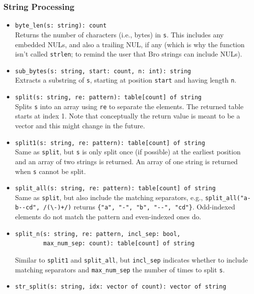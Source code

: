 \documentclass[10pt,landscape]{article}
\begin{document}
\begin{multicols*}{2}
\subsubsection*{String Processing}

\begin{itemize}
  \item \verb|byte_len(s: string): count|\\
    Returns the number of characters (i.e., bytes) in \texttt{s}.  This
    includes any embedded NULs, and also a trailing NUL, if any (which is why
    the function isn't called \verb|strlen|; to remind the user that Bro
    strings can include NULs).
  \item \verb|sub_bytes(s: string, start: count, n: int): string|\\
    Extracts a substring of \texttt{s}, starting at position \texttt{start} and
    having length \texttt{n}.
  \item \verb|split(s: string, re: pattern): table[count] of string|\\
    Splits \texttt{s} into an array using \texttt{re} to separate the elements.
    The returned table starts at index 1. Note that conceptually the return
    value is meant to be a vector and this might change in the future.
  \item \verb|split1(s: string, re: pattern): table[count] of string|\\
    Same as \texttt{split}, but \texttt{s} is only split once (if possible) at
    the earliest position and an array of two strings is returned. An array of
    one string is returned when \texttt{s} cannot be split.
  \item \verb|split_all(s: string, re: pattern): table[count] of string|\\
    Same as \texttt{split}, but also include the matching separators, e.g.,
    \verb|split_all("a-b--cd", /(\-)+/)| returns
    \verb|{"a", "-", "b", "--", "cd"}|. Odd-indexed elements do not match the
    pattern and even-indexed ones do.
  \item
\begin{verbatim}
split_n(s: string, re: pattern, incl_sep: bool,
        max_num_sep: count): table[count] of string
\end{verbatim}
    Similar to \verb|split1| and \verb|split_all|, but \verb|incl_sep|
    indicates whether to include matching separators and \verb|max_num_sep| the
    number of times to split \texttt{s}.
  \item \verb|str_split(s: string, idx: vector of count): vector of string|\\

\end{itemize}
\end{multicols*}
\end{document}
